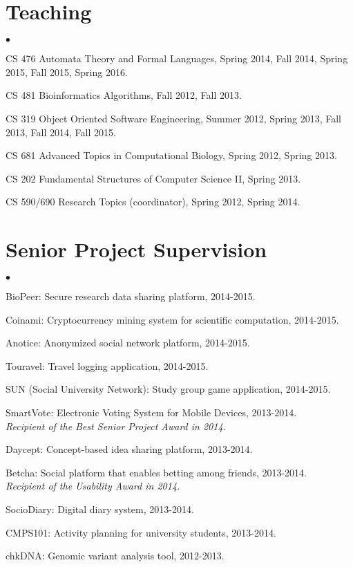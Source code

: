 \documentclass[margin,line]{res}
\newenvironment{list2}{
  \begin{list}{$\bullet$}{%
      \setlength{\itemsep}{0in}
      \setlength{\parsep}{0in} \setlength{\parskip}{0in}
      \setlength{\topsep}{0in} \setlength{\partopsep}{0in} 
      \setlength{\leftmargin}{0.2in}}}{\end{list}}
\begin{document}
\begin{resume}
\section{\sc Teaching}
\begin{list2}
  \item CS 476 Automata Theory and Formal Languages, Spring 2014, Fall 2014, Spring 2015, Fall 2015, Spring 2016.
  \item CS 481 Bioinformatics Algorithms, Fall 2012, Fall 2013.
  \item CS 319 Object Oriented Software Engineering, Summer 2012, Spring 2013, Fall 2013, Fall 2014, Fall 2015.
  \item CS 681 Advanced Topics in Computational Biology, Spring 2012, Spring 2013.
  \item CS 202 Fundamental Structures of Computer Science II, Spring 2013.
  \item CS 590/690 Research Topics (coordinator), Spring 2012, Spring 2014.
\end{list2}

\section{\sc Senior Project Supervision}
\begin{list2}
  \item BioPeer: Secure research data sharing platform, 2014-2015.
  \item Coinami: Cryptocurrency mining system for scientific computation, 2014-2015.
  \item Anotice: Anonymized social network platform, 2014-2015.
  \item Touravel: Travel logging application, 2014-2015. 
  \item SUN (Social University Network): Study group game application, 2014-2015.
  \item SmartVote: Electronic Voting System for Mobile Devices, 2013-2014. \\
    {\it Recipient of the Best Senior Project Award in 2014.}
  \item Daycept: Concept-based idea sharing platform, 2013-2014.
  \item Betcha: Social platform that enables betting among friends, 2013-2014.\\
    {\it Recipient of the Usability Award in 2014.}
  \item SocioDiary: Digital diary system, 2013-2014.
  \item CMPS101: Activity planning for university students, 2013-2014.
  \item chkDNA: Genomic variant analysis tool, 2012-2013.
\end{list2}



\end{resume}
\end{document}
